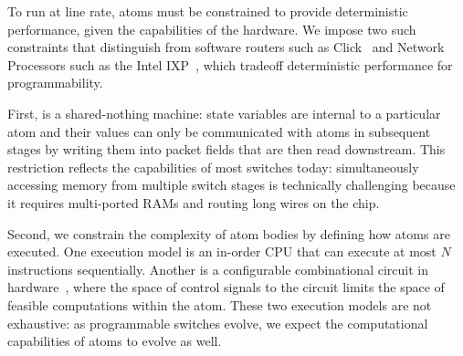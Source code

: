 To run at line rate, atoms must
be constrained to provide deterministic performance, given the
capabilities of the hardware. We impose two such constraints that
distinguish \absmachine from software routers such as
Click~\cite{click} and Network Processors such as the Intel
IXP~\cite{ixp4xx}, which tradeoff deterministic performance for
programmability.

First, \absmachine is a shared-nothing machine: state variables are
internal to a particular atom and their values can only be
communicated with atoms in subsequent stages by writing them into
packet fields that are then read downstream.  This restriction
reflects the capabilities of most switches today: simultaneously
accessing memory from multiple switch stages is technically
challenging because it requires multi-ported RAMs and routing long
wires on the chip.


Second, we constrain the complexity of atom bodies by defining how
atoms are executed. One execution model is an in-order CPU that can
execute at most $N$ instructions sequentially. Another is a
configurable combinational circuit in hardware~\cite{dataflow}, where
the space of control signals to the circuit limits the space of
feasible computations within the atom. These two execution models are
not exhaustive: as programmable switches evolve, we expect the
computational capabilities of atoms to evolve as well.

